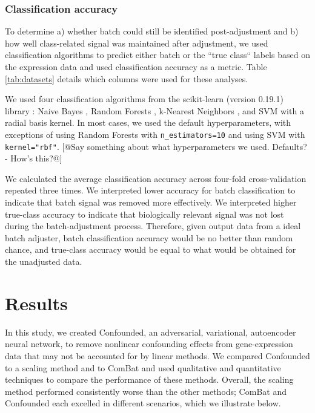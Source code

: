 \documentclass[11pt]{article}
\begin{document}
\subsubsection{Classification accuracy}

To determine
a) whether batch could still be identified post-adjustment and
b) how well class-related signal was maintained after adjustment,
we used classification algorithms to predict either batch or the ``true class`` labels based on the expression data and used classification accuracy as a metric.
Table \ref{tab:datasets} details which columns were used for these analyses.

We used four classification algorithms from the scikit-learn (version 0.19.1) library \cite{pedregosa_scikit-learn_2011}: Naive Bayes \citep{maron_automatic_1961}, Random Forests \citep{tin_kam_ho_random_1995}, k-Nearest Neighbors \citep{fix_discriminatory_1951}, and SVM \citep{cortes_support-vector_1995} with a radial basis kernel.
In most cases, we used the default hyperparameters, with exceptions of using Random Forests with \texttt{n\_estimators=10} and using SVM with \texttt{kernel="rbf"}.
[@Say something about what hyperparameters we used. Defaults? - How's this?@]

We calculated the average classification accuracy across four-fold cross-validation repeated three times.
We interpreted lower accuracy for batch classification to indicate that batch signal was removed more effectively.
We interpreted higher true-class accuracy to indicate that biologically relevant signal was not lost during the batch-adjustment process.
Therefore, given output data from a ideal batch adjuster, batch classification accuracy would be no better than random chance, and true-class accuracy would be equal to what would be obtained for the unadjusted data.

\section{Results} \label{sec:results}

In this study, we created Confounded, an adversarial, variational, autoencoder neural network, to remove nonlinear confounding effects from gene-expression data that may not be accounted for by linear methods.
We compared Confounded to a scaling method and to ComBat \citep{johnson_adjusting_2007} and used qualitative and quantitative techniques to compare the performance of these methods.
Overall, the scaling method performed consistently worse than the other methods;
ComBat and Confounded each excelled in different scenarios, which we illustrate below.
\end{document}
